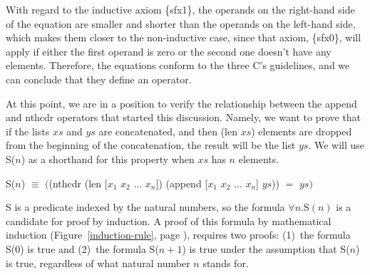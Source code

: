 With regard to the inductive axiom \{sfx1\},
the operands on the right-hand side of the equation are
smaller and shorter than the operands on the left-hand side,
which makes them closer to the non-inductive case,
since that axiom, \{sfx0\}, will apply if either the first
operand is zero or the second one doesn't have any elements.
Therefore, the equations conform to the three C's guidelines,
and we can conclude that they define an operator.

At this point, we are in a position to verify the relationship
between the \textsf{append} and \textsf{nthcdr} operators that started this discussion.
Namely, we want to prove that if the lists $xs$ and $ys$ are concatenated,
and then \textsf{(len $xs$)} elements are dropped from the beginning of the
concatenation, the result will be the list $ys$.
We will use S($n$) as a shorthand for this property
when $xs$ has $n$ elements.
\begin{center}
\label{append-prefix-thm-predicate}
S($n$) $\equiv$ $($\textsf{(nthcdr (len [$x_1$ $x_2$ $\dots$ $x_n$]) (append [$x_1$ $x_2$ $\dots$ $x_n$] $ys$))} $=$ $ys)$
\end{center}
\label{append-suffix-thm-pencil-proof}
S is a predicate indexed by the natural numbers,
so the formula $\forall n.$S$(n)$ is a candidate for proof by induction.
A proof of this formula by mathematical induction
(Figure~\ref{induction-rule}, page \pageref{induction-rule}),
requires two proofs:
(1)~the formula S(0) is true and
(2)~the formula S($n+1$) is true under the assumption that S($n$) is true,
regardless of what natural number $n$ stands for.

